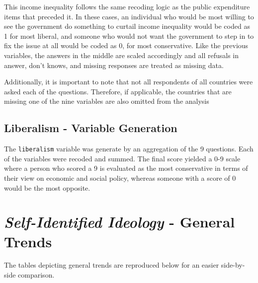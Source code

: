 \documentclass[12pt, titlepage]{article}
\newcommand\e{\emph}
\newcommand\txt{\texttt}
\begin{document}
\begin{appendices}
This income inequality follows the same recoding logic as the public expenditure items that preceded it. In these cases, an individual who would be most willing to see the government do something to curtail income inequality would be coded as 1 for most liberal, and someone who would not want the government to step in to fix the issue at all would be coded as 0, for most conservative. Like the previous variables, the answers in the middle are scaled accordingly and all refusals in answer, don't knows, and missing responses are treated as missing data.

Additionally, it is important to note that not all respondents of all countries were asked each of the questions. Therefore, if applicable, the countries that are missing one of the nine variables are also omitted from the analysis

\subsection{Liberalism - Variable Generation}

The \txt{liberalism} variable was generate by an aggregation of the 9 questions. Each of the variables were recoded and summed. The final score yielded a 0-9 scale where a person who scored a 9 is evaluated as the most conservative in terms of their view on economic and social policy, whereas someone with a score of 0 would be the most opposite.

\clearpage 


\section{\e{Self-Identified Ideology} - General Trends}
\label{AppendixD}

The tables depicting general trends are reproduced below for an easier side-by-side comparison.


\end{appendices}
\end{document}
